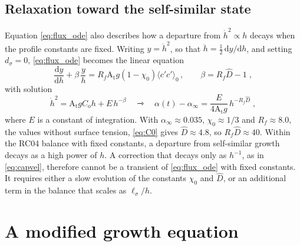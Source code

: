\documentclass[11pt]{article}
\numberwithin{equation}{section}
\newcommand{\avg}[1]{\langle #1\rangle}
\newcommand{\At}{\mathrm{A_t}}
\newcommand{\ls}{\ell_\sigma}
\newcommand{\hd}{\dot h}
\begin{document}
\subsection{Relaxation toward the self-similar state}\label{sec:rc:relax}
Equation \eqref{eq:flux_ode} also describes how a departure from $\hd^2 \propto h$ decays when the profile constants are fixed. Writing $y = \hd^2$, so that $\ddot h = \tfrac12 \, \mathrm d y/\mathrm d h$, and setting $d_\sigma = 0$, \eqref{eq:flux_ode} becomes the linear equation
\begin{equation}\label{eq:relax_ode}
\frac{\mathrm d y}{\mathrm d h} + \beta \, \frac{y}{h} = R_f \At g(1 - \chi_0) \avg{c' c'}_0 \, , \qquad
\beta = R_f \hat D - 1 \;,
\end{equation}
with solution
\begin{equation}\label{eq:relax_sol}
\hd^2 = \At g C_\mathrm{o} h + E \, h^{-\beta} \quad \rightarrowtriangle \quad
\alpha(t) - \alpha_\infty = \frac{E}{4 \At g} \, h^{-R_f \hat D} \;,
\end{equation}
where $E$ is a constant of integration. With $\alpha_\infty \approx 0.035$, $\chi_0 \approx 1/3$ and $R_f \approx 8.0$, the values without surface tension, \eqref{eq:C0} gives $\hat D \approx 4.8$, so $R_f \hat D \approx 40$. Within the RC04 balance with fixed constants, a departure from self-similar growth decays as a high power of $h$. A correction that decays only as $h^{-1}$, as in \eqref{eq:capvel}, therefore cannot be a transient of \eqref{eq:flux_ode} with fixed constants. It requires either a slow evolution of the constants $\chi_0$ and $\hat D$, or an additional term in the balance that scales as $\ls/h$.

\section{A modified growth equation}\label{sec:modified}
\end{document}
